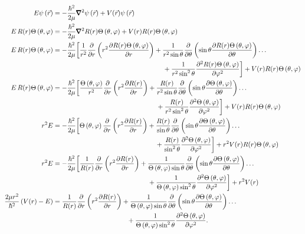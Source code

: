 \documentclass[11pt]{report}
\newcommand{\fdel}[2]{\dfrac{\partial{#1}}{\partial {#2}}} %
\newcommand{\sdel}[2]{\dfrac{\partial^2{#1}}{\partial{#2}^2}} %
\newcommand{\fpar}[1]{\left({#1}\right)}
\newcommand{\del}{\pmb{\nabla}}
\begin{document}
  \begin{align*}
        E\psi\fpar{\vec{r}}&=-\frac{\hbar^2}{2\mu}\del^2\psi\fpar{\vec{r}}+V(\vec{r})\psi\fpar{\vec{r}}\\
        E\,R(r)\Theta\fpar{\theta,\varphi}&=-\frac{\hbar^2}{2\mu}\del^2 R(r)\Theta\fpar{\theta,\varphi}+V(r) R(r)\Theta\fpar{\theta,\varphi}\\
         E\,R(r)\Theta\fpar{\theta,\varphi}&= -\frac{\hbar^2}{2\mu}\bigg[\frac{1}{r^2}\fdel{}{r}\fpar{r^2\fdel{R(r)\Theta\fpar{\theta,\varphi}}{r}} +\frac{1}{r^2\sin\theta}\fdel{}{\theta}\fpar{\sin\theta\fdel{R(r)\Theta\fpar{\theta,\varphi}}{\theta}}\ldots \\
         &\hspace{58 mm}+\frac{1}{r^2\sin^2\theta}\sdel{R(r)\Theta\fpar{\theta,\varphi}}{\varphi}\bigg] +V(r) R(r)\Theta\fpar{\theta,\varphi}  \\
         E\,R(r)\Theta\fpar{\theta,\varphi}&=-\frac{\hbar^2}{2\mu}\bigg[\frac{\Theta\fpar{\theta,\varphi}}{r^2}\fdel{}{r}\fpar{r^2\fdel{R(r)}{r}}+\frac{R(r)}{r^2\sin\theta}\fdel{}{\theta}\fpar{\sin\theta\fdel{\Theta\fpar{\theta,\varphi}}{\theta}}\ldots\\
         &\hspace{54.5 mm}+\frac{R(r)}{r^2\sin^2\theta}\sdel{\Theta\fpar{\theta,\varphi}}{\varphi}\bigg] +V(r) R(r)\Theta\fpar{\theta,\varphi}\\
         r^2E&=-\frac{\hbar^2}{2\mu}\bigg[\Theta\fpar{\theta,\varphi}\fdel{}{r}\fpar{r^2\fdel{R(r)}{r}}+\frac{R(r)}{\sin\theta}\fdel{}{\theta}\fpar{\sin\theta\fdel{\Theta\fpar{\theta,\varphi}}{\theta}}\ldots\\
         &\hspace{54 mm}+\frac{R(r)}{\sin^2\theta}\sdel{\Theta\fpar{\theta,\varphi}}{\varphi}\bigg] +r^2V(r) R(r)\Theta\fpar{\theta,\varphi} \\
         r^2E&=-\frac{\hbar^2}{2\mu}\bigg[\frac{1}{R(r)}\fdel{}{r}\fpar{r^2\fdel{R(r)}{r}}+\frac{1}{\Theta\fpar{\theta,\varphi}\sin\theta}\fdel{}{\theta}\fpar{\sin\theta\fdel{\Theta\fpar{\theta,\varphi}}{\theta}}\ldots\\
         &\hspace{50 mm}+\frac{1}{\Theta\fpar{\theta,\varphi}\sin^2\theta}\sdel{\Theta\fpar{\theta,\varphi}}{\varphi}\bigg] +r^2V(r)  \\
        \frac{2\mu r^2}{\hbar^2}\fpar{V(r)-E}&= \frac{1}{R(r)}\fdel{}{r}\fpar{r^2\fdel{R(r)}{r}}+\frac{1}{\Theta\fpar{\theta,\varphi}\sin\theta}\fdel{}{\theta}\fpar{\sin\theta\fdel{\Theta\fpar{\theta,\varphi}}{\theta}}\ldots\\
     &\hspace{39 mm}+\frac{1}{\Theta\fpar{\theta,\varphi}\sin^2\theta}\sdel{\Theta\fpar{\theta,\varphi}}{\varphi}.
    \end{align*} %
\end{document}

